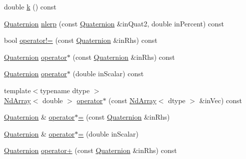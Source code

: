 \begin{DoxyCompactItemize}
\item 
double \mbox{\hyperlink{class_num_c_1_1_rotations_1_1_quaternion_aeabec8ebf3ee26c650a4d6384423eda9}{k}} () const
\item 
\mbox{\hyperlink{class_num_c_1_1_rotations_1_1_quaternion}{Quaternion}} \mbox{\hyperlink{class_num_c_1_1_rotations_1_1_quaternion_a7b05ada3d2983e8b078fe609bded008a}{nlerp}} (const \mbox{\hyperlink{class_num_c_1_1_rotations_1_1_quaternion}{Quaternion}} \&in\+Quat2, double in\+Percent) const
\item 
bool \mbox{\hyperlink{class_num_c_1_1_rotations_1_1_quaternion_aa9ef7979f86891a96ebb4fac9e44544c}{operator!=}} (const \mbox{\hyperlink{class_num_c_1_1_rotations_1_1_quaternion}{Quaternion}} \&in\+Rhs) const
\item 
\mbox{\hyperlink{class_num_c_1_1_rotations_1_1_quaternion}{Quaternion}} \mbox{\hyperlink{class_num_c_1_1_rotations_1_1_quaternion_aba5ae0731b302ddefc426c5a9d7c7366}{operator$\ast$}} (const \mbox{\hyperlink{class_num_c_1_1_rotations_1_1_quaternion}{Quaternion}} \&in\+Rhs) const
\item 
\mbox{\hyperlink{class_num_c_1_1_rotations_1_1_quaternion}{Quaternion}} \mbox{\hyperlink{class_num_c_1_1_rotations_1_1_quaternion_a9f3d11f98d72ce64ff4b2345c14448f0}{operator$\ast$}} (double in\+Scalar) const
\item 
{\footnotesize template$<$typename dtype $>$ }\\\mbox{\hyperlink{class_num_c_1_1_nd_array}{Nd\+Array}}$<$ double $>$ \mbox{\hyperlink{class_num_c_1_1_rotations_1_1_quaternion_a868fc0fae2cbd21d84b59b566fd88aeb}{operator$\ast$}} (const \mbox{\hyperlink{class_num_c_1_1_nd_array}{Nd\+Array}}$<$ dtype $>$ \&in\+Vec) const
\item 
\mbox{\hyperlink{class_num_c_1_1_rotations_1_1_quaternion}{Quaternion}} \& \mbox{\hyperlink{class_num_c_1_1_rotations_1_1_quaternion_a4eecd15c68ff81468bbd549f662b5fe2}{operator$\ast$=}} (const \mbox{\hyperlink{class_num_c_1_1_rotations_1_1_quaternion}{Quaternion}} \&in\+Rhs)
\item 
\mbox{\hyperlink{class_num_c_1_1_rotations_1_1_quaternion}{Quaternion}} \& \mbox{\hyperlink{class_num_c_1_1_rotations_1_1_quaternion_af03ac55c3ec402ac2e8649756726781e}{operator$\ast$=}} (double in\+Scalar)
\item 
\mbox{\hyperlink{class_num_c_1_1_rotations_1_1_quaternion}{Quaternion}} \mbox{\hyperlink{class_num_c_1_1_rotations_1_1_quaternion_a68e13eed7b24a8f26514ccdd4a1728bc}{operator+}} (const \mbox{\hyperlink{class_num_c_1_1_rotations_1_1_quaternion}{Quaternion}} \&in\+Rhs) const

\end{DoxyCompactItemize}

